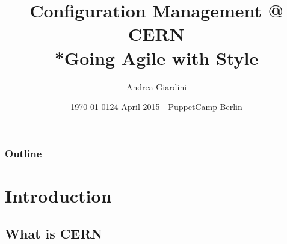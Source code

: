 \documentclass[aspectratio=169]{beamer}
\title[Configuration Management @ CERN]{Configuration Management @ CERN\\*Going Agile with Style}
\author{Andrea Giardini}
\date{\today}
\institute[CERN]
{
CERN \\
\medskip
\textit{andrea.giardini@cern.ch}
}
\date{24 April 2015 - PuppetCamp Berlin} %
\begin{document}
\cernSplashBlue

\begin{frame}
\titlepage
\end{frame}

\begin{frame}
\frametitle{Outline}
\tableofcontents
\end{frame}


\section{Introduction}

\subsection{What is CERN}
\end{document}
